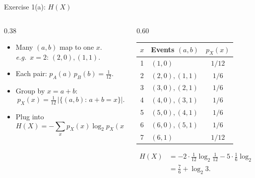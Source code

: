 \documentclass[aspectratio=169]{beamer}
\newcommand{\etpx}{H(X)}
\begin{document}
\begin{frame}{Exercise 1(a): $H(X)$}
\setlength{\abovedisplayskip}{3pt}
\setlength{\belowdisplayskip}{3pt}
\begin{columns}[T,totalwidth=\textwidth]
	\begin{column}{0.38\textwidth}
		\small
		\begin{itemize}
			\item Many $(a,b)$ map to one $x$. \\
			      \emph{e.g.}\ $x{=}2$: $(2,0),(1,1)$.
			\item Each pair: $p_A(a)\,p_B(b)=\tfrac{1}{12}$.
			\item Group by $x{=}a{+}b$:
			\[
				p_X(x) = \tfrac{1}{12}\,|\{(a,b):\, a{+}b{=}x\}|.
			\]
			\item Plug into
			\[
				\etpx = -\!\sum_x p_X(x) \log_2 p_X(x).
			\]
		\end{itemize}
	\end{column}
	\begin{column}{0.60\textwidth}
		\begin{center}
		\small
		\renewcommand{\arraystretch}{1.05}
			\begin{tabular}{c l c}
				\hline
				$x$ & Events $(a,b)$ & $p_X(x)$ \\
				\hline
				1 & $(1, 0)$	 & $1/12$ \\
				2 & $(2, 0), (1, 1)$	 & $1/6$ \\
				3 & $(3, 0), (2, 1)$	 & $1/6$ \\
				4 & $(4, 0), (3, 1)$	 & $1/6$ \\
				5 & $(5, 0), (4, 1)$	 & $1/6$ \\
				6 & $(6, 0), (5, 1)$	 & $1/6$ \\
				7 & $(6, 1)$	 & $1/12$ \\
				\hline
			\end{tabular}
		\end{center}
		\small
		\[
		\begin{aligned}
			\etpx &= -2 \cdot \tfrac{1}{12} \log_2 \tfrac{1}{12} - 5 \cdot \tfrac{1}{6} \log_2 \tfrac{1}{6} \\
			      &= \tfrac{7}{6} + \log_2 3.
		\end{aligned}
		\]
	\end{column}
\end{columns}
\end{frame}
\end{document}
